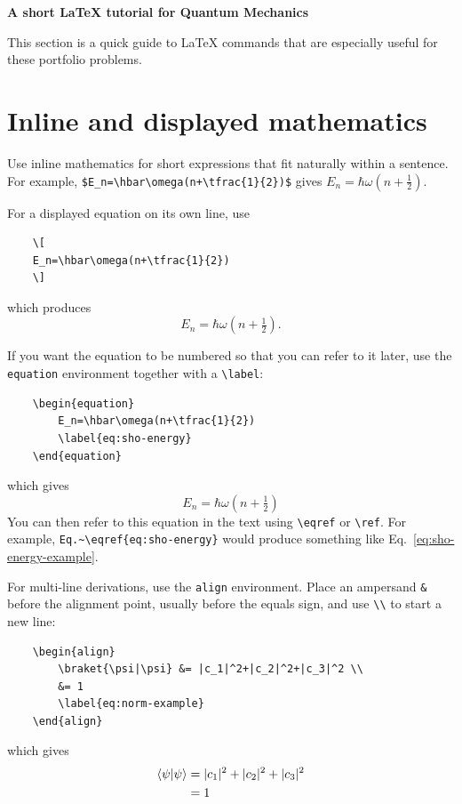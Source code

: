 \documentclass[12pt]{article}
\begin{document}
\begin{center}
{\Large\bfseries A short \LaTeX{} tutorial for Quantum Mechanics\\[0.3em]
}
\end{center}

\tableofcontents

\newpage

This section is a quick guide to \LaTeX{} commands that are especially useful for these portfolio problems.

\section{Inline and displayed mathematics}

Use inline mathematics for short expressions that fit naturally within a sentence. For example,
\verb|$E_n=\hbar\omega(n+\tfrac{1}{2})$|
gives
$E_n=\hbar\omega(n+\tfrac{1}{2})$.

For a displayed equation on its own line, use
\begin{verbatim}
	\[
	E_n=\hbar\omega(n+\tfrac{1}{2})
	\]
\end{verbatim}
which produces
\[
E_n=\hbar\omega(n+\tfrac12).
\]

If you want the equation to be numbered so that you can refer to it later, use the \verb|equation| environment together with a \verb|\label|:
\begin{verbatim}
	\begin{equation}
		E_n=\hbar\omega(n+\tfrac{1}{2})
		\label{eq:sho-energy}
	\end{equation}
\end{verbatim}
which gives
\begin{equation}
	E_n=\hbar\omega(n+\tfrac12)
	\label{eq:sho-energy-example}
\end{equation}
You can then refer to this equation in the text using \verb|\eqref| or \verb|\ref|. For example,
\verb|Eq.~\eqref{eq:sho-energy}| 
would produce something like Eq.~\eqref{eq:sho-energy-example}.

For multi-line derivations, use the \verb|align| environment. Place an ampersand \verb|&| before the alignment point, usually before the equals sign, and use \verb|\\| to start a new line:
\begin{verbatim}
	\begin{align}
		\braket{\psi|\psi} &= |c_1|^2+|c_2|^2+|c_3|^2 \\
		&= 1
		\label{eq:norm-example}
	\end{align}
\end{verbatim}
which gives
\begin{align}
	\braket{\psi|\psi} &= |c_1|^2+|c_2|^2+|c_3|^2 \\
	&= 1
	\label{eq:norm-example}
\end{align}
\end{document}
